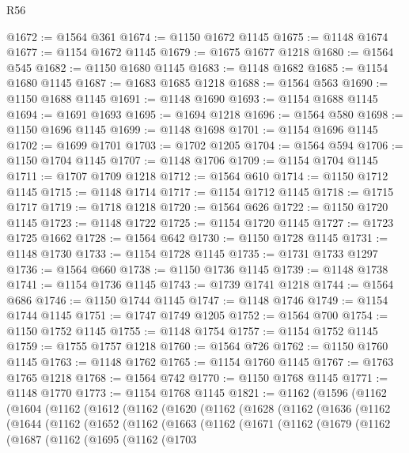 \begin{lexlean}{R56}
\begin{coremodule}
@1672 := @1564 @361
@1674 := @1150 @1672 @1145
@1675 := @1148 @1674
@1677 := @1154 @1672 @1145
@1679 := @1675 @1677 @1218
@1680 := @1564 @545
@1682 := @1150 @1680 @1145
@1683 := @1148 @1682
@1685 := @1154 @1680 @1145
@1687 := @1683 @1685 @1218
@1688 := @1564 @563
@1690 := @1150 @1688 @1145
@1691 := @1148 @1690
@1693 := @1154 @1688 @1145
@1694 := @1691 @1693
@1695 := @1694 @1218
@1696 := @1564 @580
@1698 := @1150 @1696 @1145
@1699 := @1148 @1698
@1701 := @1154 @1696 @1145
@1702 := @1699 @1701
@1703 := @1702 @1205
@1704 := @1564 @594
@1706 := @1150 @1704 @1145
@1707 := @1148 @1706
@1709 := @1154 @1704 @1145
@1711 := @1707 @1709 @1218
@1712 := @1564 @610
@1714 := @1150 @1712 @1145
@1715 := @1148 @1714
@1717 := @1154 @1712 @1145
@1718 := @1715 @1717
@1719 := @1718 @1218
@1720 := @1564 @626
@1722 := @1150 @1720 @1145
@1723 := @1148 @1722
@1725 := @1154 @1720 @1145
@1727 := @1723 @1725 @1662
@1728 := @1564 @642
@1730 := @1150 @1728 @1145
@1731 := @1148 @1730
@1733 := @1154 @1728 @1145
@1735 := @1731 @1733 @1297
@1736 := @1564 @660
@1738 := @1150 @1736 @1145
@1739 := @1148 @1738
@1741 := @1154 @1736 @1145
@1743 := @1739 @1741 @1218
@1744 := @1564 @686
@1746 := @1150 @1744 @1145
@1747 := @1148 @1746
@1749 := @1154 @1744 @1145
@1751 := @1747 @1749 @1205
@1752 := @1564 @700
@1754 := @1150 @1752 @1145
@1755 := @1148 @1754
@1757 := @1154 @1752 @1145
@1759 := @1755 @1757 @1218
@1760 := @1564 @726
@1762 := @1150 @1760 @1145
@1763 := @1148 @1762
@1765 := @1154 @1760 @1145
@1767 := @1763 @1765 @1218
@1768 := @1564 @742
@1770 := @1150 @1768 @1145
@1771 := @1148 @1770
@1773 := @1154 @1768 @1145
@1821 := @1162
    (@1596
      (@1162
        (@1604
          (@1162
            (@1612
              (@1162
                (@1620
                  (@1162
                    (@1628
                      (@1162
                        (@1636
                          (@1162
                            (@1644
                              (@1162
                                (@1652
                                  (@1162
                                    (@1663
                                      (@1162
                                        (@1671
                                          (@1162
                                            (@1679
                                              (@1162
                                                (@1687
                                                  (@1162
                                                    (@1695
                                                      (@1162
                                                        (@1703

\end{coremodule}
\end{lexlean}
